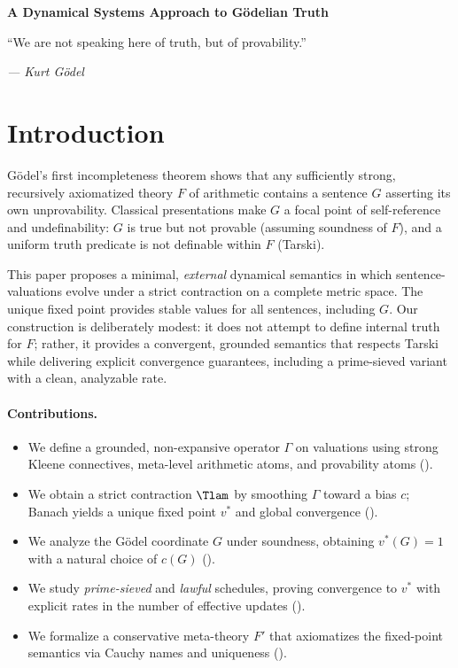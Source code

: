 \documentclass[12]{amsart}
\theoremstyle{plain}
\begin{document}
\clearpage
\clearpage
\thispagestyle{empty}
\begin{center}
    \Large\textbf{A Dynamical Systems Approach to Gödelian Truth}
\end{center}

\vspace{2em}

\epigraph{“We are not speaking here of truth, but of provability.”
}{\textit{— Kurt Gödel}}

\vspace{1em}


\section{Introduction}

G\"odel's first incompleteness theorem shows that any sufficiently strong, recursively axiomatized theory $F$ of arithmetic contains a sentence $G$ asserting its own unprovability. Classical presentations make $G$ a focal point of self-reference and undefinability: $G$ is true but not provable (assuming soundness of $F$), and a uniform truth predicate is not definable within $F$ (Tarski).

This paper proposes a minimal, \emph{external} dynamical semantics in which sentence-valuations evolve under a strict contraction on a complete metric space. The unique fixed point provides stable values for all sentences, including $G$. Our construction is deliberately modest: it does not attempt to define internal truth for $F$; rather, it provides a convergent, grounded semantics that respects Tarski while delivering explicit convergence guarantees, including a prime-sieved variant with a clean, analyzable rate.

\paragraph{Contributions.}
\begin{itemize}[leftmargin=2em]
\item We define a grounded, non-expansive operator $\Gamma$ on valuations using strong Kleene connectives, meta-level arithmetic atoms, and provability atoms ().
\item We obtain a strict contraction $\Tlam$ by smoothing $\Gamma$ toward a bias $c$; Banach yields a unique fixed point $v^*$ and global convergence ().
\item We analyze the G\"odel coordinate $G$ under soundness, obtaining $v^*(G)=1$ with a natural choice of $c(G)$ ().
\item We study \emph{prime-sieved} and \emph{lawful} schedules, proving convergence to $v^*$ with explicit rates in the number of effective updates ().
\item We formalize a conservative meta-theory $F'$ that axiomatizes the fixed-point semantics via Cauchy names and uniqueness ().
\end{itemize}
\end{document}
